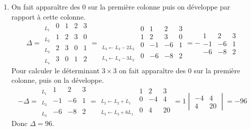\documentclass[11pt,a4paper]{article}
\begin{document}
\begin{enumerate}
  \item 
On fait apparaître des $0$ sur la première colonne puis on développe par rapport à cette colonne.
$$\Delta = \begin{array}{l|cccc|} 
_{L_1} & 0 & 1 & 2 & 3 \\ _{L_2} & 1 & 2 & 3 & 0 \\ _{L_3} & 2 & 3 & 0 & 1 \\ _{L_4} & 3 & 0 & 1 & 2 \end{array}
=  \begin{array}{l|cccc|}& 0 & 1 & 2 & 3\\  & 1 & 2 & 3 & 0\\ _{L_3 \leftarrow L_3 -2 L_2} & 0 & -1 & -6 & 1\\ _{L_4\leftarrow L_4 -3 L_2} & 0 & -6 & -8 & 2\end{array}
= - \begin{array}{|ccc|}  1 & 2 & 3\\  -1 & -6 & 1\\  -6 & -8 & 2\end{array}
$$
Pour calculer le déterminant $3\times 3$ on fait apparaître des $0$ sur la première colonne, puis on la développe.
$$-\Delta = \begin{array}{l|ccc|} _{L_1} & 1 & 2 & 3\\ _{L_2} & -1 & -6 & 1\\ _{L_3} & -6 & -8 & 2\end{array}
= \begin{array}{l|ccc|}  & 1 & 2 & 3\\ _{L_2\leftarrow L_2+L_1} & 0 & -4 & 4\\ _{L_3\leftarrow L_3+6L_1} & 0 & 4 & 20\end{array}
=1\begin{vmatrix}-4 & 4 \\ 4 & 20\end{vmatrix} = -96
$$
Donc $\Delta=96$.



\end{enumerate}
\end{document}
